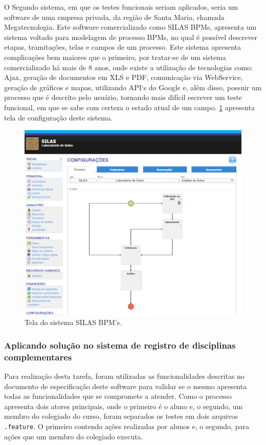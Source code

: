 \documentclass[tg]{mdtufsm}
\begin{document}
O Segundo sistema, em que os testes funcionais seriam aplicados, seria um software de uma empresa privada, da região de Santa Maria, chamada Megatecnologia. Este software comercializado como SILAS BPMs, apresenta
um sistema voltado para modelagem de processo BPMs, no qual é possível descrever etapas, tramitações, telas e campos de um processo. Este sistema apresenta complicações bem maiores que o primeiro, por tratar-se de um sistema comercializado há mais de 8 anos, onde existe a utilização de tecnologias como: Ajax, geração de documentos em XLS e PDF, comunicação via WebService, geração de gráficos e mapas, utilizando API`s do Google e, além disso, possuir um processo que é descrito pelo usuário, tornando mais difícil escrever um teste funcional, em que se sabe com certeza o estado atual de um campo. \ref{fig:silas} apresenta tela de configuração deste sistema.

\begin{figure}[!htb]
	\centering
	\includegraphics[width=0.8
	\textwidth]{silas}
	\caption{Tela do sistema SILAS BPM's.}
	\label{fig:silas}
\end{figure}

\subsubsection{Aplicando solução no sistema de registro de disciplinas complementares}
Para realização desta tarefa, foram utilizadas as funcionalidades descritas no documento de especificação deste software para validar se o mesmo apresenta todas as funcionalidades que se compromete a atender.
Como o processo apresenta dois atores principais, onde o primeiro é o aluno e, o segundo, um membro do colegiado do curso, foram separados os testes em dois arquivos \texttt{.feature}. O primeiro contendo ações realizadas por alunos e, o segundo, para ações que um membro do colegiado executa.
\end{document}
